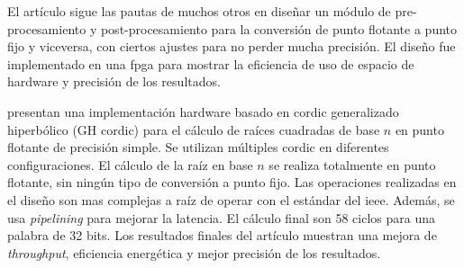 El artículo sigue las pautas de muchos otros en diseñar un módulo de pre-procesamiento y post-procesamiento para la conversión de punto flotante a punto fijo y viceversa, con ciertos ajustes para no perder mucha precisión. El diseño fue implementado en una \gls{fpga} para mostrar la eficiencia de uso de espacio de hardware y precisión de los resultados.

\cite{wang_gh_2020} presentan una implementación hardware basado en \gls{cordic} generalizado hiperbólico (GH \gls{cordic}) para el cálculo de raíces cuadradas de base $n$ en punto flotante de precisión simple. Se utilizan múltiples \gls{cordic} en diferentes configuraciones. El cálculo de la raíz en base $n$ se realiza totalmente en punto flotante, sin ningún tipo de conversión a punto fijo. Las operaciones realizadas en el diseño son mas complejas a raíz de operar con el estándar del \gls{ieee}. Además, se usa \textit{pipelining} para mejorar la latencia. El cálculo final son 58 ciclos para una palabra de 32 bits. Los resultados finales del artículo muestran una mejora de \textit{throughput}, eficiencia energética y mejor precisión de los resultados. 














